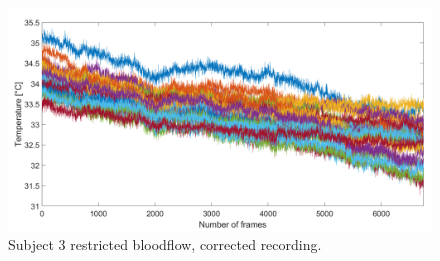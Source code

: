 \begin{figure}[htbp]
\begin{minipage}[b]{0.45\linewidth}
	\end{minipage}
	\hspace{0.2cm}
	\begin{minipage}[b]{0.45\linewidth}
		\centering
		\includegraphics[width=\linewidth]{figures/Recordings/Sub3_cuffed_corr}
		\caption{Subject 3 restricted bloodflow, corrected recording.}
	
	\end{minipage}
\end{figure}


